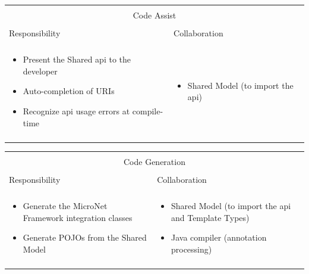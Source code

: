 \vspace{0.5cm} \noindent      
\begin{tabular}{|l|l|}
    \cline{1-2}
    \multicolumn{2}{|c|}{} \\[-0.3cm]
    \multicolumn{2}{|c|}{Code Assist} \\ 
    \multicolumn{2}{|c|}{} \\[-0.3cm]
    \cline{1-2}
    Responsibility & Collaboration \\
    \cline{1-2}
    & \\[-0.2cm]
    \begin{minipage}{0.47\textwidth}
        \begin{itemize}
          \item Present the Shared \gls{api} to the developer
          \item Auto-completion of URIs
          \item Recognize \gls{api} usage errors at compile-time
        \end{itemize} 
    \end{minipage}
	&
    \begin{minipage}{0.47\textwidth}
        \begin{itemize}
          \item Shared Model (to import the \gls{api})
        \end{itemize} 
    \end{minipage}
	\\ & \\
    \hline
\end{tabular}

\vspace{0.5cm} \noindent         
\begin{tabular}{|l|l|}
    \cline{1-2}
    \multicolumn{2}{|c|}{} \\[-0.3cm]
    \multicolumn{2}{|c|}{Code Generation} \\ 
    \multicolumn{2}{|c|}{} \\[-0.3cm]
    \cline{1-2}
    Responsibility & Collaboration \\
    \cline{1-2}
    & \\[-0.2cm]
    \begin{minipage}{0.47\textwidth}
        \begin{itemize}
          \item Generate the MicroNet Framework integration classes
          \item Generate POJOs from the Shared Model
        \end{itemize} 
    \end{minipage}
	&
    \begin{minipage}{0.47\textwidth}
        \begin{itemize}
          \item Shared Model (to import the \gls{api} and Template Types)
          \item Java compiler (annotation processing)
        \end{itemize} 
    \end{minipage}
	\\ & \\
    \hline
\end{tabular}

